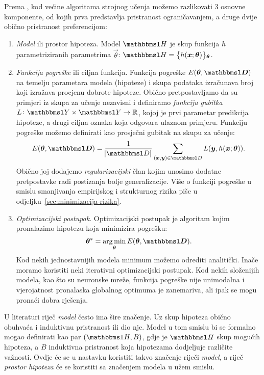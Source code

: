 \documentclass[utf8, diplomski, lmodern]{fer}
\begin{document}
Prema \citet{Snajder:2014:SU}, kod većine algoritama strojnog učenja možemo razlikovati 3 osnovne komponente, od kojih prva predstavlja pristranost ograničavanjem, a druge dvije obično pristranost preferencijom:
\begin{enumerate}
	\item \emph{Model} ili prostor hipoteza. Model $\set H$ je skup funkcija $h$  parametriziranih parametrima $\vec\theta$: $\set H=\cbr{h(\vec x;\vec{\theta})}_{\vec{\theta}}$.
	\item \emph{Funkcija pogreške} ili ciljna funkcija. Funkcija pogreške $E(\vec{\theta,\set D})$ na temelju parametara modela (hipoteze) i skupa podataka izračunava broj koji izražava procjenu dobrote hipoteze. Obično pretpostavljamo da su primjeri iz skupa za učenje nezavisni i definiramo \emph{funkciju gubitka} $\funcdef{L}{\set Y\times\set Y}{\R}$, kojoj je prvi parametar predikcija hipoteze, a drugi ciljna oznaka koja odgovara ulaznom primjeru. Funkciju pogreške možemo definirati kao prosječni gubitak na skupu za učenje:
	\begin{align}
	E(\vec{\theta,\set D})=\frac{1}{\envert{\set D}}\sum_{(\vec x,\vec y)\in\set D} L(\vec y,h(\vec x;\vec{\theta})) \text{.}
	\end{align}
	Obično joj dodajemo \emph{regularizacijski} član kojim unosimo dodatne pretpostavke radi postizanja bolje generalizacije. Više o funkciji pogreške u smislu smanjivanja empirijskog i strukturnog rizika piše u odjeljku~\ref{sec:minimizacija-rizika}.
	\item \emph{Optimizacijski postupak}. Optimizacijski postupak je algoritam kojim pronalazimo hipotezu koja minimizira pogrešku:
	\begin{align}
	\vec\theta^* = \argmin_{\vec{\theta}} E(\vec{\theta,\set D}) \text{.}
	\end{align}
	Kod nekih jednostavnijih modela minimum možemo odrediti analitički. Inače moramo koristiti neki iterativni optimizacijski postupak. Kod nekih složenijih modela, kao što su neuronske mreže, funkcija pogreške nije unimodalna i vjerojatnost pronalaska globalnog optimuma je zanemariva, ali ipak se mogu pronaći dobra rješenja.
\end{enumerate}

U literaturi riječ \textit{model} često ima šire značenje. Uz skup hipoteza obično obuhvaća i induktivnu pristranost ili dio nje. Model u tom smislu bi se formalno mogao definirati kao par $(\set H, B)$, gdje je $\set H$ skup mogućih hipoteza, a $B$ induktivna pristranost koja hipotezama dodjeljuje različite važnosti. Ovdje će se u nastavku koristiti takvo značenje riječi \textit{model}, a riječ \textit{prostor hipoteza} će se koristiti sa značenjem modela u užem smislu.
\end{document}
